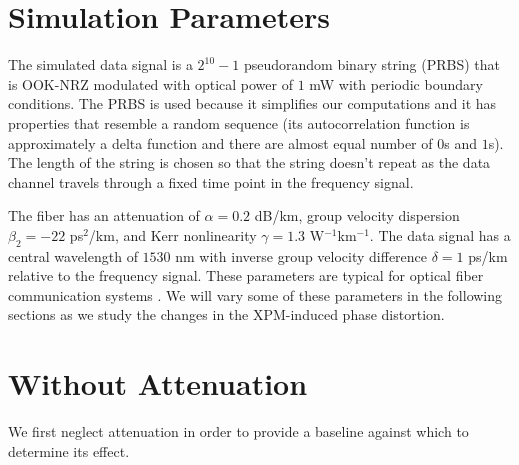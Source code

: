\section{Simulation Parameters}

The simulated data signal is a $2^{10}-1$ pseudorandom binary string (PRBS) \cite{PRBS} that is OOK-NRZ modulated with optical power of $1$ mW with periodic boundary conditions. The PRBS is used because it simplifies our computations and it has properties that resemble a random sequence (its autocorrelation function is approximately a delta function and there are almost equal number of $0$s and $1$s). The length of the string is chosen so that the string doesn't repeat as the data channel travels through a fixed time point in the frequency signal.

The fiber has an attenuation of $\alpha = 0.2$ dB/km, group velocity dispersion $\beta_2 = -22$ ps$^2$/km, and Kerr nonlinearity $\gamma = 1.3$ W$^{-1}$km$^{-1}$. The data signal has a central wavelength of $1530$ nm with inverse group velocity difference $\delta = 1$ ps/km relative to the frequency signal. These parameters are typical for optical fiber communication systems \cite{agrawal2012fiber,Agrawal2013}. We will vary some of these parameters in the following sections as we study the changes in the XPM-induced phase distortion.


\section{Without Attenuation}

We first neglect attenuation in order to provide a baseline against which to determine its effect.

